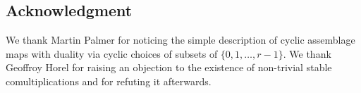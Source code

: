 
\subsection*{Acknowledgment}

We thank Martin Palmer for noticing the simple description of cyclic assemblage maps with duality via cyclic choices of subsets of $\{0,1,\ldots,r-1\}$. We thank Geoffroy Horel for raising an objection to the existence of non-trivial stable comultiplications and for refuting it afterwards.
